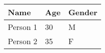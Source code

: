 \documentclass{article}
\begin{document}
\begin{tabular}{| l | l | l |}
\hline
Name & Age & Gender\\ \hline
Person 1 & 30 & M\\ \hline

Person 2 & 35 & F\\ \hline

\end{tabular}
\end{document}

